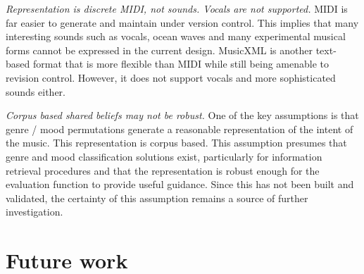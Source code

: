 \documentclass[final,authoryear,5p,times,twocolumn]{elsarticle}
\begin{document}
\textit{Representation is discrete MIDI, not sounds. Vocals are not supported.} MIDI is far easier to generate and maintain under version control. This implies that many interesting sounds such as vocals, ocean waves and many experimental musical forms cannot be expressed in the current design. MusicXML is another text-based format that is more flexible than MIDI while still being amenable to revision control. However, it does not support vocals and more sophisticated sounds either. 

\textit{Corpus based shared beliefs may not be robust.} One of the key assumptions is that genre / mood permutations generate a reasonable representation of the intent of the music. This representation is corpus based. This assumption presumes that genre and mood classification solutions exist, particularly for information retrieval procedures and that the representation is robust enough for the evaluation function to provide useful guidance. Since this has not been built and validated, the certainty of this assumption remains a source of further investigation.





\section {Future work}

 
\end{document}
